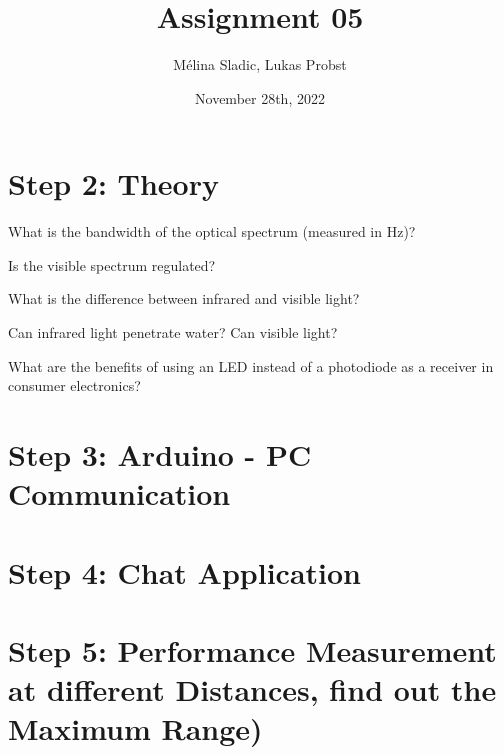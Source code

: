 \documentclass[
	12pt, %
]{fphw}
\title{Assignment 05} %
\author{Mélina Sladic, Lukas Probst} %
\date{November 28th, 2022} %
\institute{Eidgenössische Technische Hochschule Zürich} %
\begin{document}
\maketitle %


\section*{Step 2: Theory}

\begin{problem}
	What is the bandwidth of the optical spectrum (measured in Hz)?
\end{problem}

\begin{problem}
	Is the visible spectrum regulated?
\end{problem}

\begin{problem}
	What is the difference between infrared and visible light?
\end{problem}

\begin{problem}
	Can infrared light penetrate water? Can visible light?
\end{problem}

\begin{problem}
	What are the benefits of using an LED instead of a photodiode as a receiver in consumer electronics?
\end{problem}





\section*{Step 3: Arduino - PC Communication}




\section*{Step 4: Chat Application}



\section*{Step 5: Performance Measurement at different Distances, find out the Maximum Range)}




\clearpage
\printbibliography
\end{document}
